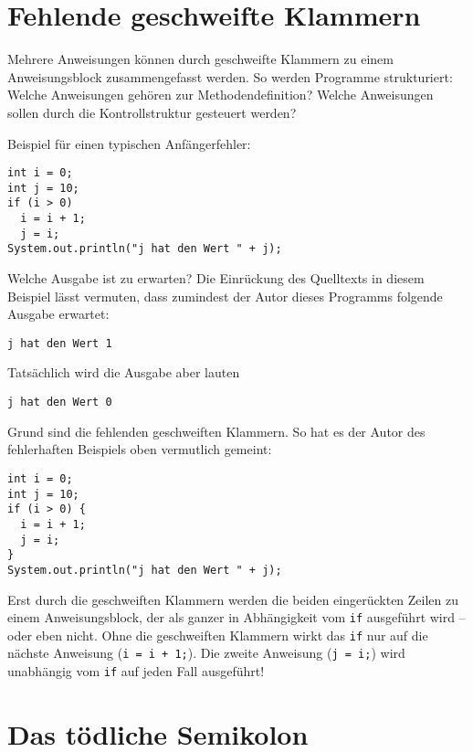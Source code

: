 \section{Fehlende geschweifte Klammern}

Mehrere Anweisungen können durch geschweifte Klammern zu einem Anweisungsblock
zusammengefasst werden. So werden Programme strukturiert: Welche Anweisungen
gehören zur Methodendefinition? Welche Anweisungen sollen durch die
Kontrollstruktur gesteuert werden?

Beispiel für einen typischen Anfängerfehler:

\begin{lstlisting}
int i = 0;
int j = 10;
if (i > 0)
  i = i + 1;
  j = i;
System.out.println("j hat den Wert " + j);
\end{lstlisting}

Welche Ausgabe ist zu erwarten? Die Einrückung des Quelltexts in diesem Beispiel
lässt vermuten, dass zumindest der Autor dieses Programms folgende Ausgabe
erwartet:

\begin{lstlisting}
j hat den Wert 1
\end{lstlisting}

Tatsächlich wird die Ausgabe aber lauten

\begin{lstlisting}
j hat den Wert 0
\end{lstlisting}

Grund sind die fehlenden geschweiften Klammern. So hat es der Autor des
fehlerhaften Beispiels oben vermutlich gemeint:

\begin{lstlisting}
int i = 0;
int j = 10;
if (i > 0) {
  i = i + 1;
  j = i;
}
System.out.println("j hat den Wert " + j);
\end{lstlisting}

Erst durch die geschweiften Klammern werden die beiden eingerückten Zeilen zu
einem Anweisungsblock, der als ganzer in Abhängigkeit vom \lstinline|if|
ausgeführt wird -- oder eben nicht. Ohne die geschweiften Klammern wirkt das
\lstinline|if| nur auf die nächste Anweisung (\lstinline|i = i + 1;|). Die
zweite Anweisung (\lstinline|j = i;|) wird unabhängig vom \lstinline|if| auf jeden Fall
ausgeführt!


\section{Das tödliche Semikolon}

